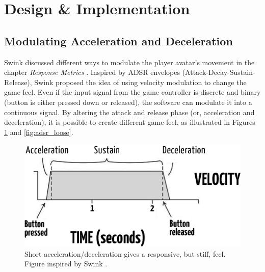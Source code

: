 \section{Design \& Implementation} \label{design}
\subsection{Modulating Acceleration and Deceleration}
Swink discussed different ways to modulate the player avatar's movement in the chapter \textit{Response Metrics} \cite{swink}. Inspired by ADSR envelopes (Attack-Decay-Sustain-Release), Swink proposed the idea of using velocity modulation to change the game feel. Even if the input signal from the game controller is discrete and binary (button is either pressed down or released), the software can modulate it into a continuous signal. By altering the attack and release phase (or, acceleration and deceleration), it is possible to create different game feel, as illustrated in Figures \ref{fig:adsr_stiff} and \ref{fig:adsr_loose}.





\begin{figure}[htbp]
\centering
\includegraphics[width=0.6\columnwidth]{Pics/stiff2}
\caption{Short acceleration/deceleration gives a responsive, but stiff, feel. Figure inspired by Swink \cite{swink}.}
\label{fig:adsr_stiff}
\end{figure}

